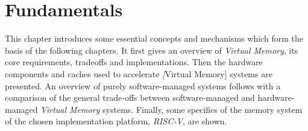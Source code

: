 \chapter{Fundamentals} %
\label{chap:fund}

%


This chapter introduces some essential concepts and mechanisms which form the basis of the following
chapters. It first gives an overview of \textit{Virtual Memory}, its core requirements,
tradeoffs and implementations.
Then the hardware components and caches used to accelerate \textit[Virtual Memory] systems are
presented.
An overview of purely software-managed systems follows with a comparison of the general trade-offs
between software-managed and hardware-managed \textit{Virtual Memory} systems.
Finally, some specifics of the memory system of the chosen implementation platform, \textit{RISC-V},
are shown.

